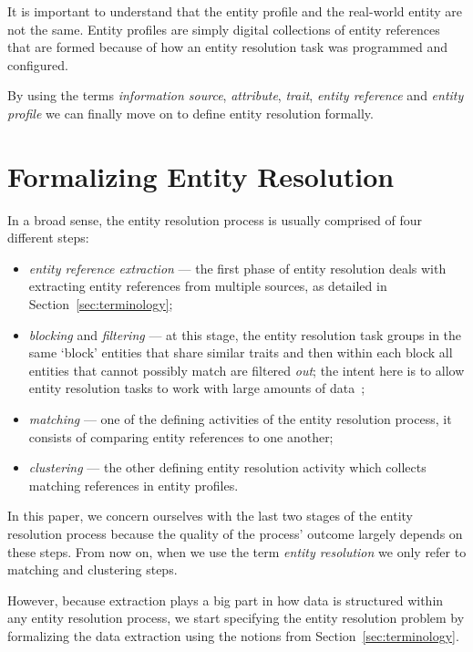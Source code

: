 \documentclass[journal]{IEEEtran}
\begin{document}
    It is important to understand that the entity profile and the real-world
    entity are not the same.
    Entity profiles are simply digital collections of entity references that are
    formed because of how an entity resolution task was programmed and
    configured.
    
    By using the terms \textit{information source}, \textit{attribute},
    \textit{trait}, \textit{entity reference} and \textit{entity profile} we can
    finally move on to define entity resolution formally.

    \section{Formalizing Entity Resolution}\label{sec:entity-resolution}

    In a broad sense, the entity resolution process is usually comprised of four
    different steps\cite{Pap19,Tal11}:

    \begin{itemize}
        \item \textit{entity reference extraction} --- the first phase of entity
        resolution deals with extracting entity references from multiple
        sources, as detailed in Section~\ref{sec:terminology};
        \item \textit{blocking} and \textit{filtering} --- at this stage, the
        entity resolution task groups in the same `block' entities that share
        similar traits and then within each block all entities that cannot
        possibly match are filtered \textit{out}; the intent here is to allow
        entity resolution tasks to work with large amounts of data~\cite{Pap19};
        \item \textit{matching} --- one of the defining activities of the entity
        resolution process, it consists of comparing entity references to one
        another;
        \item \textit{clustering} --- the other defining entity resolution
        activity which collects matching references in entity profiles.
    \end{itemize}

    In this paper, we concern ourselves with the last two stages of the entity
    resolution process because the quality of the process' outcome largely
    depends on these steps.
    From now on, when we use the term \textit{entity resolution} we only refer
    to matching and clustering steps.

    However, because extraction plays a big part in how data is structured
    within any entity resolution process, we start specifying the entity
    resolution problem by formalizing the data extraction using the notions from
    Section~\ref{sec:terminology}.
    
\end{document}
